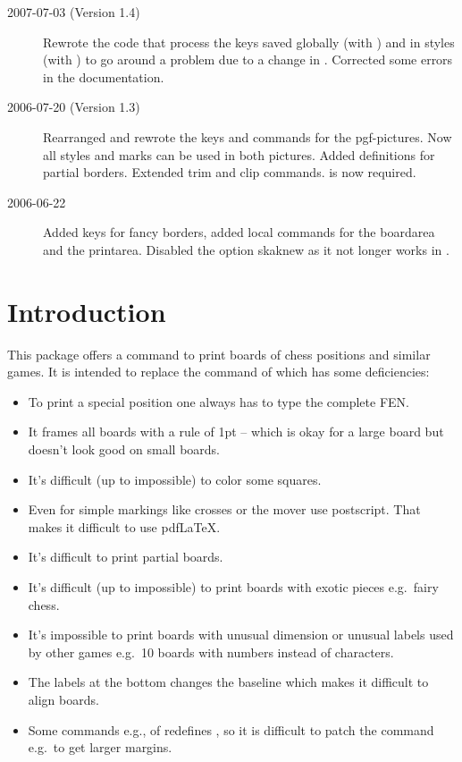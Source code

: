 \documentclass[pagesize,parskip=half-,fontsize=12pt]{scrartcl}
\begin{document}
\begin{description}
\item[2007-07-03 (Version 1.4)] Rewrote the code that process the
keys saved globally (with ) and  in styles (with
) to go around a problem due to a change in
. Corrected some errors in the
documentation.
\item[2006-07-20 (Version 1.3)] Rearranged and rewrote the keys and commands for
the pgf-pictures. Now all styles and marks can be used in both
pictures. Added definitions for partial borders. Extended trim and
clip commands.  is now required.
\item[2006-06-22] Added keys for fancy borders, added local commands for
the boardarea and the printarea. Disabled the option skaknew as it
not longer works in \chessfss.
\end{description}




\section{Introduction}
 \DescribeMacro{\chessboard} This package
offers a command \keyoarg{} to print boards of chess
positions and similar games. It is intended to replace the
 command of \skaksty which has some deficiencies:
\begin{itemize}
\item To print a special position one always has to type the
complete FEN.
\item It frames all boards with a  rule of 1pt -- which is okay
for a large board but doesn't look good on small boards.
\item It's difficult (up to impossible) to color some squares.
\item Even for simple markings like crosses or the mover \skaksty use
postscript. That makes it difficult to use pdf\LaTeX.
\item It's difficult to print partial boards.
\item It's difficult (up to impossible) to print boards with exotic
pieces e.g.\ fairy chess.
\item It's impossible to print boards with unusual dimension or unusual labels used by other games e.g.\
10 boards with numbers instead of characters.
\item The labels at the bottom changes the baseline which makes it
difficult to align boards.
\item Some commands e.g.,  of  \skaksty redefines , so it
is difficult to patch the command e.g.\ to get larger margins.
\end{itemize}
\end{document}
